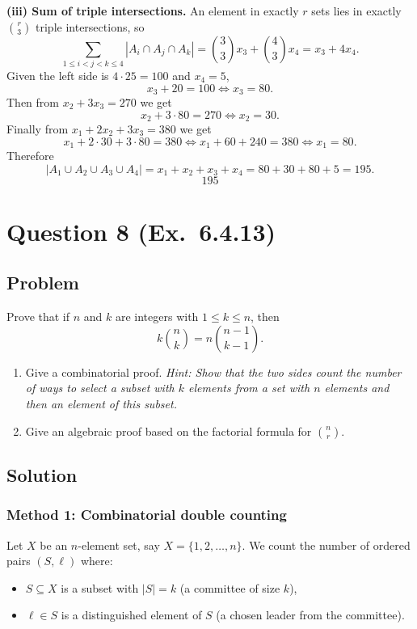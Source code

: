 \documentclass[12pt]{article}
\begin{document}
\medskip
\noindent\textbf{(iii) Sum of triple intersections.}
An element in exactly $r$ sets lies in exactly $\binom{r}{3}$ triple intersections, so
\[
\sum_{1\le i<j<k\le 4}|A_i\cap A_j\cap A_k|=\binom{3}{3}x_3+\binom{4}{3}x_4=x_3+4x_4.
\]
Given the left side is $4\cdot 25=100$ and $x_4=5$,
\[
x_3+20=100 \iff x_3=80.
\]
Then from $x_2+3x_3=270$ we get
\[
x_2+3\cdot 80=270 \iff x_2=30.
\]
Finally from $x_1+2x_2+3x_3=380$ we get
\[
x_1+2\cdot 30+3\cdot 80=380 \iff x_1+60+240=380 \iff x_1=80.
\]
Therefore
\[
|A_1\cup A_2\cup A_3\cup A_4|=x_1+x_2+x_3+x_4=80+30+80+5=195.
\]
\[
\boxed{195}
\]

\newpage

\section{Question 8 (Ex.\ 6.4.13)}
\subsection{Problem}
Prove that if $n$ and $k$ are integers with $1\le k\le n$, then
\[
k\binom{n}{k}=n\binom{n-1}{k-1}.
\]
\begin{enumerate}[label=(\alph*)]
\item Give a combinatorial proof. \emph{Hint: Show that the two sides count the number of ways to select a subset with $k$ elements from a set with $n$ elements and then an element of this subset.}
\item Give an algebraic proof based on the factorial formula for $\binom{n}{r}$.
\end{enumerate}

\subsection{Solution}

\subsubsection{Method 1: Combinatorial double counting}
Let $X$ be an $n$-element set, say $X=\{1,2,\dots,n\}$. We count the number of ordered pairs $(S,\ell)$ where:
\begin{itemize}[leftmargin=*]
\item $S\subseteq X$ is a subset with $|S|=k$ (a committee of size $k$),
\item $\ell\in S$ is a distinguished element of $S$ (a chosen leader from the committee).
\end{itemize}
\end{document}
